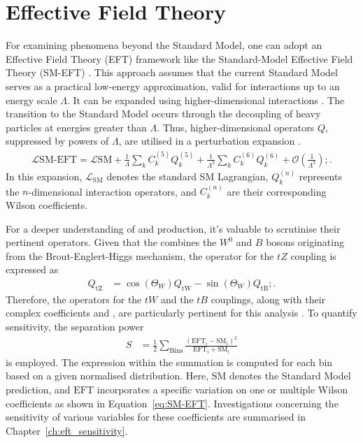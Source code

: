 \section{Effective Field Theory}
\label{sec:theory_eft}
For examining phenomena beyond the Standard Model, one can adopt an Effective Field Theory (EFT) framework like the Standard-Model Effective Field Theory (SM-EFT) \cite{eft_operatorlist}. This approach assumes that the current Standard Model serves as a practical low-energy approximation, valid for interactions up to an energy scale $\Lambda$. It can be expanded using higher-dimensional interactions \cite{eft_introduction}. The transition to the Standard Model occurs through the decoupling of heavy particles at energies greater than $\Lambda$. Thus, higher-dimensional operators $Q$, suppressed by powers of $\Lambda$, are utilised in a perturbation expansion \cite{eft_introduction}.
\begin{align}
\mathcal{L}\text{SM-EFT} = \mathcal{L}\text{SM} + \frac{1}{\Lambda}\sum_{k}C_k^{(5)}Q_k^{(5)} + \frac{1}{\Lambda^2}\sum_{k}C_k^{(6)}Q_k^{(6)} + \mathcal{O}\left(\frac{1}{\Lambda^3}\right);.\label{eq:SM-EFT}
\end{align}
In this expansion, $\mathcal{L}_\text{SM}$ denotes the standard SM Lagrangian, $Q_k^{(n)}$ represents the $n$-dimensional interaction operators, and $C_k^{(n)}$ are their corresponding Wilson coefficients.

For a deeper understanding of \ttbarZ and \ttbarW production, it's valuable to scrutinise their pertinent operators. Given that the \zboson combines the $W^0$ and $B$ bosons originating from the Brout-Englert-Higgs mechanism, the operator \optZ for the $tZ$ coupling is expressed as \cite{higgs_mechanism_1}
\begin{align}
Q_\text{tZ} &= \cos(\Theta_W)Q_\text{tW} - \sin(\Theta_W)Q_\text{tB};.\label{eq:OparatortZ}
\end{align}
Therefore, the operators for the $tW$ and the $tB$ couplings, along with their complex coefficients \ctW and \ctB, are particularly pertinent for this analysis \cite{eft_operatorlist}. To quantify sensitivity, the separation power
\begin{align}
S &= \frac{1}{2}\sum_\text{Bins}\frac{\left(\text{EFT}_i-\text{SM}_i\right)^2}{\text{EFT}_i+\text{SM}_i}\label{eq:SeparationPower}
\end{align}
is employed. The expression within the summation is computed for each bin based on a given normalised distribution. Here, $\text{SM}$ denotes the Standard Model prediction, and $\text{EFT}$ incorporates a specific variation on one or multiple Wilson coefficients as shown in Equation~\ref{eq:SM-EFT}. Investigations concerning the sensitivity of various variables for these coefficients are summarised in Chapter~\ref{ch:eft_sensitivity}.


